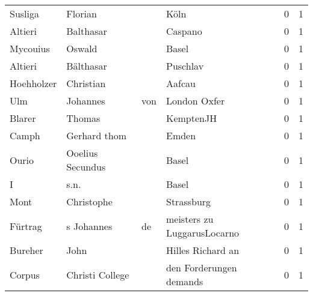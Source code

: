 \documentclass[10pt,a4paper,landscape]{article}
\begin{document}
\begin{longtable}{llllrr}
                  Susliga &                            Florian &             &                                        Köln &          0 &         1 \\
                  Altieri &                          Balthasar &             &                                     Caspano &          0 &         1 \\
                 Mycouius &                             Oswald &             &                                       Basel &          0 &         1 \\
                  Altieri &                          Bälthasar &             &                                    Puschlav &          0 &         1 \\
               Hoehholzer &                          Christian &             &                                      Aafcau &          0 &         1 \\
                      Ulm &                           Johannes &         von &                                London Oxfer &          0 &         1 \\
                   Blarer &                             Thomas &             &                                   KemptenJH &          0 &         1 \\
                    Camph &                       Gerhard thom &             &                                       Emden &          0 &         1 \\
                    Ourio &                   Ooelius Secundus &             &                                       Basel &          0 &         1 \\
                        I &                               s.n. &             &                                       Basel &          0 &         1 \\
                     Mont &                         Christophe &             &                                  Strassburg &          0 &         1 \\
                  Fürtrag &                         s Johannes &          de &                 meisters zu LuggarusLocarno &          0 &         1 \\
                  Bureher &                               John &             &                           Hilles Richard an &          0 &         1 \\
                   Corpus &                    Christi College &             &                     den Forderungen demands &          0 &         1 \\

\end{longtable}
\end{document}
